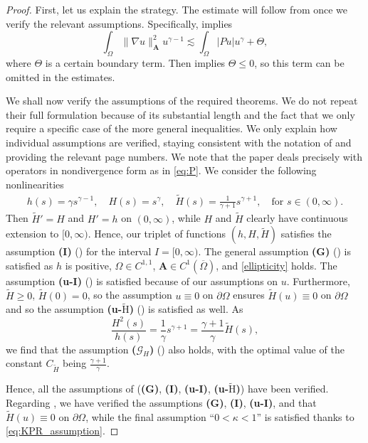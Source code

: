 \documentclass[12pt,a4paper]{amsart}
\theoremstyle{definition}
\newcommand{\A}{\mathbf{A}}
\begin{document}
\begin{proof} 
First, let us explain the strategy. The estimate will follow from \cite[Theorems~4.1 and 4.4]{MR4948792} once we verify the relevant assumptions. Specifically, \cite[Theorem~4.4, ii)]{MR4948792} implies
    \begin{equation*}
        \int_\Omega \|\nabla u\|_{\A}^2 u^{\gamma -1} \lesssim \int_\Omega \lvert Pu \rvert u^\gamma + \Theta,
    \end{equation*}
    where $\Theta$ is a certain boundary term. Then \cite[Theorem~4.1, i)]{MR4948792} implies $\Theta \leq 0$, so this term can be omitted in the estimates.
    
    We shall now verify the assumptions of the required theorems. We do not repeat their full formulation because of its substantial length and the fact that we only require a specific case of the more general inequalities. We only explain how individual assumptions are verified, staying consistent with the notation of \cite{MR4948792} and providing the relevant page numbers. We note that the paper \cite{MR4948792} deals precisely with operators in nondivergence form as in \eqref{eq:P}. We consider the following nonlinearities 
     \begin{align*}
        h(s) = \gamma s^{\gamma-1}, \quad 
        H(s) = s^{\gamma}, \quad 
        \widetilde{H}(s) = \frac{1}{\gamma+1} s^{\gamma+1},\quad  \text{for } s \in (0, \infty).
    \end{align*}
    Then $\widetilde{H}' = H$ and $H' = h$ on $(0, \infty)$, while $H$ and $\widetilde{H}$ clearly have continuous extension to $[0, \infty)$. Hence, our triplet of functions $(h, H, \widetilde{H})$ satisfies the assumption \textbf{(I)} (\cite[p.~8]{MR4948792}) for the interval $I = [0, \infty)$. The general assumption \textbf{(G)} (\cite[p.~7]{MR4948792}) is satisfied as $h$ is positive, $\Omega\in C^{1,1}$, $\A\in C^1(\overline{\Omega})$, and \eqref{ellipticity} holds. The assumption \textbf{(u-I)} (\cite[p.~8]{MR4948792}) is satisfied because of our assumptions on $u$. Furthermore, $\widetilde{H} \geq 0$, $\widetilde{H}(0) = 0$, so the assumption $u \equiv 0$ on $\partial \Omega$ ensures $\widetilde{H}(u) \equiv 0$ on $\partial \Omega$ and so the assumption \textbf{(u-$\widetilde{\text{H}}$)} (\cite[p.~9]{MR4948792}) is satisfied as well. As
    \begin{equation*}
        \frac{H^2(s)}{h(s)} = \frac{1}{\gamma} s^{\gamma+1} = \frac{\gamma+1}{\gamma} \widetilde{H}(s),
    \end{equation*}
    we find that the assumption {\bf ($\mathcal{G}_H$)} (\cite[p.~9]{MR4948792}) also holds, with the optimal value of the constant $C_{\widetilde{H}}$ being $\frac{\gamma+1}{\gamma}$.

    Hence, all the assumptions of \cite[Theorem~4.1, i)]{MR4948792} (\textbf{(G)}, \textbf{(I)}, \textbf{(u-I)}, \textbf{(u-$\widetilde{\text{H}}$)}) have been verified. Regarding \cite[Theorem~4.4, ii)]{MR4948792}, we have verified the assumptions \textbf{(G)}, \textbf{(I)}, \textbf{(u-I)}, and that  $\widetilde{H}(u) \equiv 0$ on $\partial \Omega$, while the final assumption ``$0< \kappa <1$'' is satisfied thanks to \eqref{eq:KPR_assumption}.
\end{proof}
\end{document}
